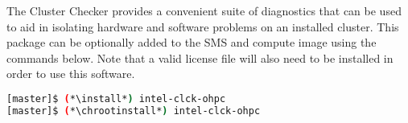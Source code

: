 The \Intel{} Cluster Checker provides a convenient suite of diagnostics that
can be used to aid in isolating hardware and software problems on an installed
cluster. This package can be optionally added to the SMS and compute image
using the commands below. Note that a valid license file will also need to be
installed in order to use this software.

\begin{lstlisting}[language=bash,keywords={}]
[master]$ (*\install*) intel-clck-ohpc
[master]$ (*\chrootinstall*) intel-clck-ohpc
\end{lstlisting}
